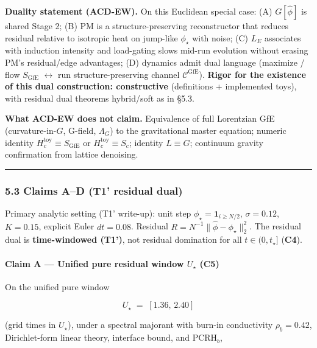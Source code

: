 \documentclass[
  11pt,
]{article}
\begin{document}
\textbf{Duality statement (ACD-EW).} On this Euclidean special case: (A)
\(G[\hat\phi]\) is shared Stage 2; (B) PM is a structure-preserving
reconstructor that reduces residual relative to isotropic heat on
jump-like \(\phi_\star\) with noise; (C) \(L_E\) associates with
induction intensity and load-gating slows mid-run evolution without
erasing PM's residual/edge advantages; (D) dynamics admit dual language
(maximize / flow \(S_{\mathrm{GfE}}\) \(\leftrightarrow\) run
structure-preserving channel \(\mathcal{C}^{\mathrm{GfE}}\)).
\textbf{Rigor for the existence of this dual construction: constructive}
(definitions + implemented toys), with residual dual theorems
hybrid/soft as in §5.3.

\textbf{What ACD-EW does not claim.} Equivalence of full Lorentzian GfE
(curvature-in-\(G\), G-field, \(\Lambda_G\)) to the gravitational master
equation; numeric identity \(H_c^{\mathrm{toy}}\equiv S_{\mathrm{GfE}}\)
or \(H_c^{\mathrm{toy}}\equiv S_c\); identity \(L\equiv G\); continuum
gravity confirmation from lattice denoising.

\begin{center}\rule{0.5\linewidth}{0.5pt}\end{center}

\subsubsection{5.3 Claims A--D (T1' residual
dual)}\label{claims-ad-t1-residual-dual}

Primary analytic setting (T1' write-up): unit step
\(\phi_\star=\mathbf{1}_{i\ge N/2}\), \(\sigma=0.12\), \(K=0.15\),
explicit Euler \(dt=0.08\). Residual
\(R=N^{-1}\|\hat\phi-\phi_\star\|_2^2\). The residual dual is
\textbf{time-windowed (T1')}, not residual domination for all
\(t\in(0,t_\star]\) (\textbf{C4}).

\paragraph{\texorpdfstring{Claim A --- Unified pure residual window
\(U_\star\)
(\textbf{C5})}{Claim A --- Unified pure residual window U\_\textbackslash star (C5)}}\label{claim-a-unified-pure-residual-window-u_star-c5}

On the unified pure window

\[
U_\star \;=\; [1.36,\,2.40]
\]

(grid times in \(U_\star\)), under a spectral majorant with burn-in
conductivity \(\rho_b=0.42\), Dirichlet-form linear theory, interface
bound, and PCRH\(_b\),
\end{document}
